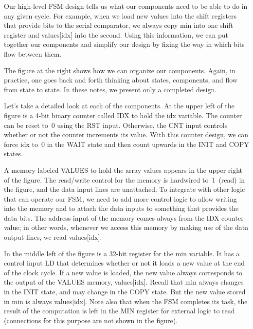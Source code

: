 \begin{minipage}{2.41in}
Our high-level FSM design tells us what our components need to be able to
do in any given cycle.  For example, when we load new values into the shift
registers that provide bits to the serial comparator, we always copy 
{\tfix min} into one shift register and {\tfix values[idx]} into the second.
Using this information, we can put together our components and simplify our
design by fixing the way in which bits flow between them.\mpline

The figure at the right shows how we can organize our components.
Again, in practice, one goes back and forth thinking about states,
components, and flow from state to state.  In these notes, we 
present only a completed design.\mpline

Let's take a detailed look at each of the components.
%
At the upper left of the figure is a \mbox{4-bit} binary counter called
{\tfix IDX} to hold the {\tfix idx}
variable.  The counter can be reset to~0 using the {\tfix RST} input.
Otherwise, the {\tfix CNT} input controls whether or not the counter
increments its value.  With this counter design, we can force {\tfix idx} 
to~0 in the {\tfix WAIT} state and then count upwards in the {\tfix INIT}
and {\tfix COPY} states.
\end{minipage}\hspace{.25in}%
\begin{minipage}{3.84in}
\centerline{}
\end{minipage}

A memory labeled {\tfix VALUES} to hold the array {\tfix values} appears 
in the upper right of
the figure.  The read/write control for the memory is hardwired to~1~(read)
in the figure, and the data input lines are unattached.  To integrate 
with other logic that can operate our FSM, we need to add more 
control logic to allow writing into the memory and to attach the data
inputs to something that provides the data bits.  The address input of
the memory comes always from the {\tfix IDX} counter value; in other words,
whenever we access this memory by making use of the data output lines,
we read {\tfix values[idx]}.

In the middle left of the figure is a \mbox{32-bit} register for the 
{\tfix min} variable.  It has a control input {\tfix LD} that 
determines whether or not it loads a new value at the end of the clock
cycle.  If a new value is loaded, the new value always corresponds to
the output of the {\tfix VALUES} memory, {\tfix values[idx]}.  Recall
that {\tfix min} always changes in the {\tfix INIT} state, and may change
in the {\tfix COPY} state.  But the new value stored in {\tfix min}
is always {\tfix values[idx]}. 
Note also that when the FSM completes its task, the result of the 
computation is left in the {\tfix MIN} register for external logic to
read (connections for this purpose are not shown in the figure).

